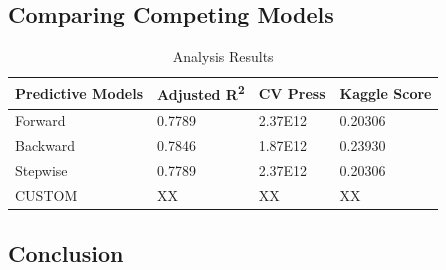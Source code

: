 \documentclass[11pt]{scrartcl} %
\begin{document}
\subsection{Comparing Competing Models}
\begin{table}[h] %
	\centering %
\begin{tabular}{|l|l|l|l|}
\hline
\textbf{Predictive Models} & \textbf{Adjusted R\textsuperscript{2}} & \textbf{CV Press} & \textbf{Kaggle Score}\\
\hline
Forward & 0.7789 & 2.37E12 & 0.20306\\
\hline
Backward & 0.7846 & 1.87E12 & 0.23930\\
\hline
Stepwise & 0.7789 & 2.37E12 & 0.20306\\
\hline
CUSTOM & XX & XX & XX\\
\hline
\end{tabular}
\caption{Analysis Results}
\end{table}


\subsection{Conclusion}


\appendix{} 
\pagebreak
\end{document}
